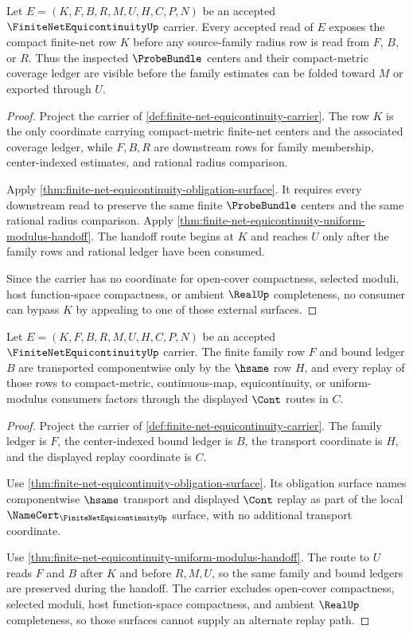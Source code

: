 \begin{theorem}
\label{thm:finite-net-equicontinuity-compact-net-coverage}
Let $E=(K,F,B,R,M,U,H,C,P,N)$ be an accepted $\FiniteNetEquicontinuityUp$ carrier. Every accepted read of $E$ exposes the compact finite-net row $K$ before any source-family radius row is read from $F$, $B$, or $R$. Thus the inspected $\ProbeBundle$ centers and their compact-metric coverage ledger are visible before the family estimates can be folded toward $M$ or exported through $U$.
\end{theorem}
\begin{proof}
Project the carrier of \autoref{def:finite-net-equicontinuity-carrier}. The row $K$ is the only coordinate carrying compact-metric finite-net centers and the associated coverage ledger, while $F,B,R$ are downstream rows for family membership, center-indexed estimates, and rational radius comparison.

Apply \autoref{thm:finite-net-equicontinuity-obligation-surface}. It requires every downstream read to preserve the same finite $\ProbeBundle$ centers and the same rational radius comparison. Apply \autoref{thm:finite-net-equicontinuity-uniform-modulus-handoff}. The handoff route begins at $K$ and reaches $U$ only after the family rows and rational ledger have been consumed.

Since the carrier has no coordinate for open-cover compactness, selected moduli, host function-space compactness, or ambient $\RealUp$ completeness, no consumer can bypass $K$ by appealing to one of those external surfaces.
\end{proof}

\begin{theorem}
\label{thm:finite-net-equicontinuity-family-row-stability}
Let $E=(K,F,B,R,M,U,H,C,P,N)$ be an accepted $\FiniteNetEquicontinuityUp$ carrier. The finite family row $F$ and bound ledger $B$ are transported componentwise only by the $\hsame$ row $H$, and every replay of those rows to compact-metric, continuous-map, equicontinuity, or uniform-modulus consumers factors through the displayed $\Cont$ routes in $C$.
\end{theorem}
\begin{proof}
Project the carrier of \autoref{def:finite-net-equicontinuity-carrier}. The family ledger is $F$, the center-indexed bound ledger is $B$, the transport coordinate is $H$, and the displayed replay coordinate is $C$.

Use \autoref{thm:finite-net-equicontinuity-obligation-surface}. Its obligation surface names componentwise $\hsame$ transport and displayed $\Cont$ replay as part of the local $\NameCert_{\FiniteNetEquicontinuityUp}$ surface, with no additional transport coordinate.

Use \autoref{thm:finite-net-equicontinuity-uniform-modulus-handoff}. The route to $U$ reads $F$ and $B$ after $K$ and before $R,M,U$, so the same family and bound ledgers are preserved during the handoff. The carrier excludes open-cover compactness, selected moduli, host function-space compactness, and ambient $\RealUp$ completeness, so those surfaces cannot supply an alternate replay path.
\end{proof}

